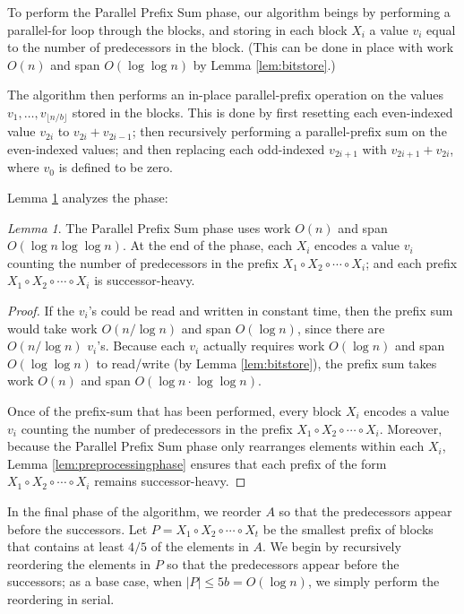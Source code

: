 \documentclass[sigplan, 10pt, nonacm]{acmart}
\renewcommand{\paragraph}[1]{\vspace{0.09in}\noindent{\bf \boldmath #1.}}
\theoremstyle{remark}
\newtheorem{lemma}[thm]{Lemma}
\theoremstyle{remark}
\begin{document}
To perform the Parallel Prefix Sum phase, our algorithm beings by
performing a parallel-for loop through the blocks, and storing in each
block $X_i$ a value $v_i$ equal to the number of predecessors in the
block. (This can be done in place with work $O(n)$ and span $O(\log
\log n)$ by Lemma \ref{lem:bitstore}.)

The algorithm then performs an in-place parallel-prefix operation on
the values $v_1, \ldots, v_{\lfloor n / b \rfloor}$ stored in the
blocks. This is done by first resetting each even-indexed value
$v_{2i}$ to $v_{2i} + v_{2i - 1}$; then recursively performing a
parallel-prefix sum on the even-indexed values; and then replacing
each odd-indexed $v_{2i + 1}$ with $v_{2i + 1} + v_{2i}$, where $v_0$
is defined to be zero.

Lemma \ref{lem:parallelprefix} analyzes the phase:
\begin{lemma}
The Parallel Prefix Sum phase uses work $O(n)$ and span $O(\log n \log
\log n)$. At the end of the phase, each $X_i$ encodes a value $v_i$
counting the number of predecessors in the prefix $X_1 \circ X_2 \circ
\cdots \circ X_i$; and each prefix $X_1 \circ X_2 \circ \cdots \circ
X_i$ is successor-heavy.
\label{lem:parallelprefix}
\end{lemma}
\begin{proof}
If the $v_i$'s could be read and written in constant time, then the
prefix sum would take work $O(n / \log n)$ and span $O(\log n)$, since
there are $O(n / \log n)$ $v_i$'s. Because each $v_i$ actually
requires work $O(\log n)$ and span $O(\log \log n)$ to read/write (by
Lemma \ref{lem:bitstore}), the prefix sum takes work $O(n)$ and span
$O(\log n \cdot \log \log n)$.

Once of the prefix-sum that has been performed, every block $X_i$
encodes a value $v_i$ counting the number of predecessors in the
prefix $X_1 \circ X_2 \circ \cdots \circ X_i$. Moreover, because the
Parallel Prefix Sum phase only rearranges elements within each $X_i$,
Lemma \ref{lem:preprocessingphase} ensures that each prefix of the
form $X_1 \circ X_2 \circ \cdots \circ X_i$ remains successor-heavy.
\end{proof}

\paragraph{In-Place Reordering}
In the final phase of the algorithm, we reorder $A$ so that the
predecessors appear before the successors. Let $P = X_1 \circ X_2
\circ \cdots \circ X_t$ be the smallest prefix of blocks that contains
at least $4/5$ of the elements in $A$. We begin by recursively
reordering the elements in $P$ so that the predecessors appear before
the successors; as a base case, when $|P| \le 5b = O(\log n)$, we
simply perform the reordering in serial.
\end{document}
